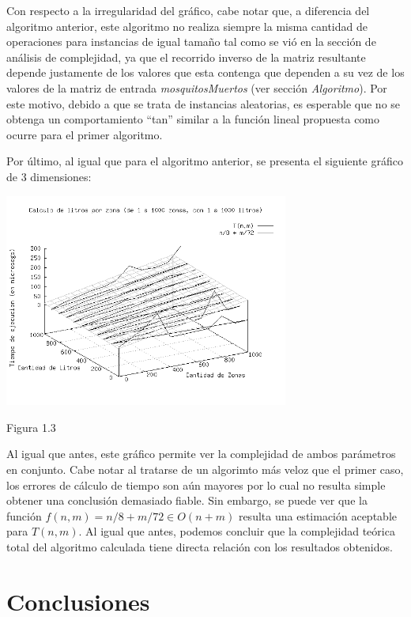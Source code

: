 \documentclass[a4paper,11pt] {article}
\begin{document}
Con respecto a la irregularidad del gr\'afico, cabe notar que, a diferencia del algoritmo anterior, este algoritmo no realiza siempre la misma cantidad de operaciones para instancias de igual tamaño tal como se vi\'o en la secci\'on de an\'alisis de complejidad, ya que el recorrido inverso de la matriz resultante depende justamente de los valores que esta contenga que dependen a su vez de los valores de la matriz de entrada \textit{mosquitosMuertos} (ver secci\'on \textit{Algoritmo}). Por este motivo, debido a que se trata de instancias aleatorias, es esperable que no se obtenga un comportamiento ``tan'' similar a la funci\'on lineal propuesta como ocurre para el primer algoritmo.

Por \'ultimo, al igual que para el algoritmo anterior, se presenta el siguiente gr\'afico de 3 dimensiones:

\begin{center}
 \includegraphics[width=0.7\textwidth]{Plots/Tp2Ej1-TiemposLitrosPorZona-3d-bw.png}
\begin{center}
Figura 1.3
\end{center}
\end{center}

Al igual que antes, este gr\'afico permite ver la complejidad de ambos par\'ametros en conjunto. Cabe notar al tratarse de un algorimto más veloz que el primer caso, los errores de cálculo de tiempo son aún mayores por lo cual no resulta simple obtener una conclusión demasiado fiable. Sin embargo, se puede ver que la función $f(n,m) = n/8 + m/72 \in O(n + m)$ resulta una estimación aceptable para $T(n,m)$. Al igual que antes, podemos concluir que la complejidad teórica total del algoritmo calculada tiene directa relación con los resultados obtenidos.

\section*{Conclusiones}
\end{document}
